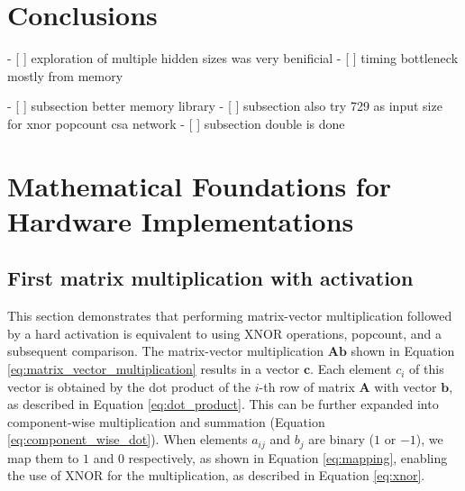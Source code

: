 \documentclass[conference]{IEEEtran}
\newcounter{todocount}
\newcommand{\todo}[1]{
  \stepcounter{todocount}
}
\begin{document}

\section{Conclusions}
	- [ ] exploration of multiple hidden sizes was very benificial
	- [ ] timing bottleneck mostly from memory

\todo{future work}
	- [ ] subsection better memory library
	- [ ] subsection also try 729 as input size for xnor popcount csa network
	- [ ] subsection double is done



\appendix

\section{Mathematical Foundations for Hardware Implementations}

\label{appendix:bnn_maths}

\subsection{First matrix multiplication with activation}

This section demonstrates that performing matrix-vector multiplication followed by a hard activation is equivalent to using XNOR operations, popcount, and a subsequent comparison.
The matrix-vector multiplication \(\mathbf{A} \mathbf{b}\) shown in Equation \ref{eq:matrix_vector_multiplication} results in a vector \(\mathbf{c}\). Each element \(c_i\) of this vector is obtained by the dot product of the \(i\)-th row of matrix \(\mathbf{A}\) with vector \(\mathbf{b}\), as described in Equation \ref{eq:dot_product}. This can be further expanded into component-wise multiplication and summation (Equation \ref{eq:component_wise_dot}). When elements \(a_{ij}\) and \(b_j\) are binary (\(1\) or \(-1\)), we map them to \(1\) and \(0\) respectively, as shown in Equation \ref{eq:mapping}, enabling the use of XNOR for the multiplication, as described in Equation \ref{eq:xnor}.
\end{document}
